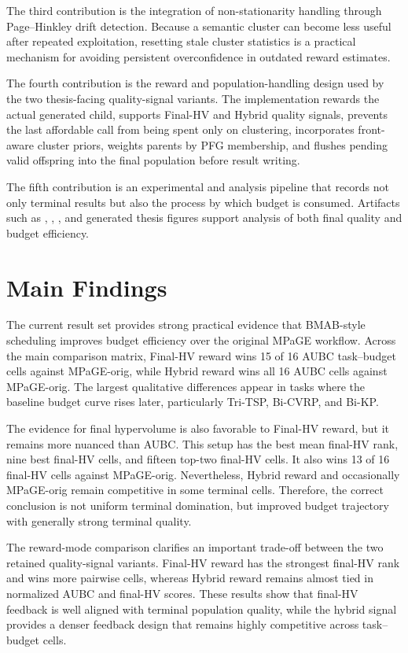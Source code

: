 \documentclass[../main.tex]{subfiles}
\begin{document}
The third contribution is the integration of non-stationarity handling through Page--Hinkley drift detection. Because a semantic cluster can become less useful after repeated exploitation, resetting stale cluster statistics is a practical mechanism for avoiding persistent overconfidence in outdated reward estimates.

The fourth contribution is the reward and population-handling design used by the two thesis-facing quality-signal variants. The implementation rewards the actual generated child, supports Final-HV and Hybrid quality signals, prevents the last affordable call from being spent only on clustering, incorporates front-aware cluster priors, weights parents by PFG membership, and flushes pending valid offspring into the final population before result writing.

The fifth contribution is an experimental and analysis pipeline that records not only terminal results but also the process by which budget is consumed. Artifacts such as , , , and generated thesis figures support analysis of both final quality and budget efficiency.

\section{Main Findings}

The current result set provides strong practical evidence that BMAB-style scheduling improves budget efficiency over the original MPaGE workflow. Across the main comparison matrix, Final-HV reward wins 15 of 16 AUBC task--budget cells against MPaGE-orig, while Hybrid reward wins all 16 AUBC cells against MPaGE-orig. The largest qualitative differences appear in tasks where the baseline budget curve rises later, particularly Tri-TSP, Bi-CVRP, and Bi-KP.

The evidence for final hypervolume is also favorable to Final-HV reward, but it remains more nuanced than AUBC. This setup has the best mean final-HV rank, nine best final-HV cells, and fifteen top-two final-HV cells. It also wins 13 of 16 final-HV cells against MPaGE-orig. Nevertheless, Hybrid reward and occasionally MPaGE-orig remain competitive in some terminal cells. Therefore, the correct conclusion is not uniform terminal domination, but improved budget trajectory with generally strong terminal quality.

The reward-mode comparison clarifies an important trade-off between the two retained quality-signal variants. Final-HV reward has the strongest final-HV rank and wins more pairwise cells, whereas Hybrid reward remains almost tied in normalized AUBC and final-HV scores. These results show that final-HV feedback is well aligned with terminal population quality, while the hybrid signal provides a denser feedback design that remains highly competitive across task--budget cells.
\end{document}
